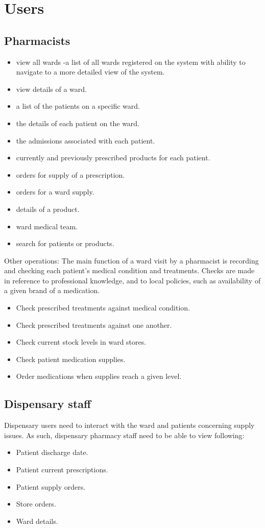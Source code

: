 \documentclass[letterpaper]{amsart}
\begin{document}
\section{Users}
\subsection{Pharmacists}
\begin{itemize}
    \item view all wards -a list of all wards registered on the system with ability to navigate to a more detailed view of the system.
    \item view details of a  ward.
    \item a list of the patients on a specific ward.
    \item the details of each patient on the ward.
    \item the admissions associated with each patient.
    \item currently and previously prescribed products for each patient.
    \item orders for supply of a prescription.
    \item orders for a ward supply.
    \item details of a product.
    \item ward medical team.
    \item search for patients or products. 
\end{itemize}
Other operations:
The main function of a ward visit by a pharmacist is recording and checking each patient's medical condition and treatments.  Checks are made in reference to professional knowledge, and to local policies, such as availability of a given brand of a medication.
\begin{itemize}
    \item Check prescribed treatments against medical condition.
    \item Check prescribed treatments against one another.
    \item Check current stock levels in ward stores.
    \item Check patient medication supplies.
    \item Order medications when supplies reach a given level.
\end{itemize}

\subsection{Dispensary staff}
Dispensary users need to interact with the ward and patients concerning supply issues.  As such, dispensary pharmacy staff need to be able to view following:
\begin{itemize} 
    \item Patient discharge date.
    \item Patient current prescriptions.
    \item Patient supply orders.
    \item Store orders.
    \item Ward details. 
\end{itemize}
\end{document}
